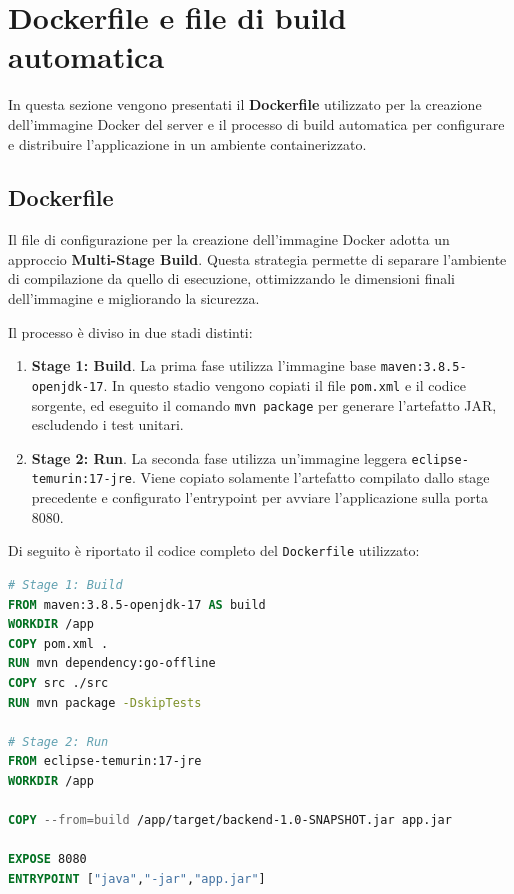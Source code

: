\section{Dockerfile e file di build automatica}
In questa sezione vengono presentati il \textbf{Dockerfile} utilizzato per la creazione dell'immagine Docker del server e il 
processo di build automatica per configurare e distribuire l'applicazione in un ambiente containerizzato.

\subsection{Dockerfile}
Il file di configurazione per la creazione dell'immagine Docker adotta un approccio \textbf{Multi-Stage Build}. Questa strategia permette di separare l'ambiente di compilazione da quello di esecuzione, ottimizzando le dimensioni finali dell'immagine e migliorando la sicurezza.

Il processo è diviso in due stadi distinti:
\begin{enumerate}
    \item \textbf{Stage 1: Build}. La prima fase utilizza l'immagine base \texttt{maven:3.8.5-openjdk-17}. In questo stadio vengono copiati il file \texttt{pom.xml} e il codice sorgente, ed eseguito il comando \texttt{mvn package} per generare l'artefatto JAR, escludendo i test unitari.
    \item \textbf{Stage 2: Run}. La seconda fase utilizza un'immagine leggera \texttt{eclipse-temurin:17-jre}. Viene copiato solamente l'artefatto compilato dallo stage precedente e configurato l'entrypoint per avviare l'applicazione sulla porta 8080.
\end{enumerate}

Di seguito è riportato il codice completo del \texttt{Dockerfile} utilizzato:

\begin{lstlisting}[language=Dockerfile, caption={Dockerfile per la build del backend}]
# Stage 1: Build
FROM maven:3.8.5-openjdk-17 AS build
WORKDIR /app
COPY pom.xml .
RUN mvn dependency:go-offline
COPY src ./src
RUN mvn package -DskipTests

# Stage 2: Run
FROM eclipse-temurin:17-jre
WORKDIR /app

COPY --from=build /app/target/backend-1.0-SNAPSHOT.jar app.jar

EXPOSE 8080
ENTRYPOINT ["java","-jar","app.jar"]
\end{lstlisting}

